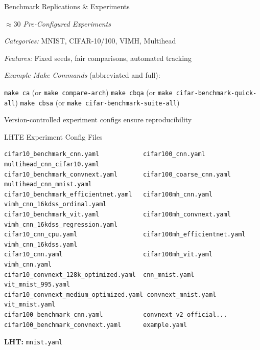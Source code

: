 \begin{slide}[\slideopts,toc={Benchmarks}]{Benchmark Replications \& Experiments}

  \emph{$\approx 30$ Pre-Configured Experiments}

  \begin{itemize}
    \mpitem \emph{Categories:} MNIST, CIFAR-10/100, VIMH, Multihead

    \mpitem \emph{Features:} Fixed seeds, fair comparisons, automated tracking

    \mpitem \emph{Example Make Commands} (abbreviated and full):
    \begin{itemize}
      \mpitem \texttt{make ca} \quad \quad (or \texttt{make compare-arch})
      \mpitem \texttt{make cbqa} \quad (or \texttt{make cifar-benchmark-quick-all})
      \mpitem \texttt{make cbsa} \quad (or \texttt{make cifar-benchmark-suite-all})
    \end{itemize}
    \mpitem Version-controlled experiment configs ensure reproducibility
  \end{itemize}
\end{slide}

\begin{wideslide}[\slideopts,toc={Experiments},method=direct]{LHTE Experiment Config Files}
{\footnotesize
\begin{verbatim}
cifar10_benchmark_cnn.yaml            cifar100_cnn.yaml             multihead_cnn_cifar10.yaml
cifar10_benchmark_convnext.yaml       cifar100_coarse_cnn.yaml      multihead_cnn_mnist.yaml
cifar10_benchmark_efficientnet.yaml   cifar100mh_cnn.yaml           vimh_cnn_16kdss_ordinal.yaml
cifar10_benchmark_vit.yaml            cifar100mh_convnext.yaml      vimh_cnn_16kdss_regression.yaml
cifar10_cnn_cpu.yaml                  cifar100mh_efficientnet.yaml  vimh_cnn_16kdss.yaml
cifar10_cnn.yaml                      cifar100mh_vit.yaml           vimh_cnn.yaml
cifar10_convnext_128k_optimized.yaml  cnn_mnist.yaml                vit_mnist_995.yaml
cifar10_convnext_medium_optimized.yaml convnext_mnist.yaml           vit_mnist.yaml
cifar100_benchmark_cnn.yaml           convnext_v2_official...
cifar100_benchmark_convnext.yaml      example.yaml
\end{verbatim}
}
\textbf{LHT:} \; \texttt{mnist.yaml}
\end{wideslide}


